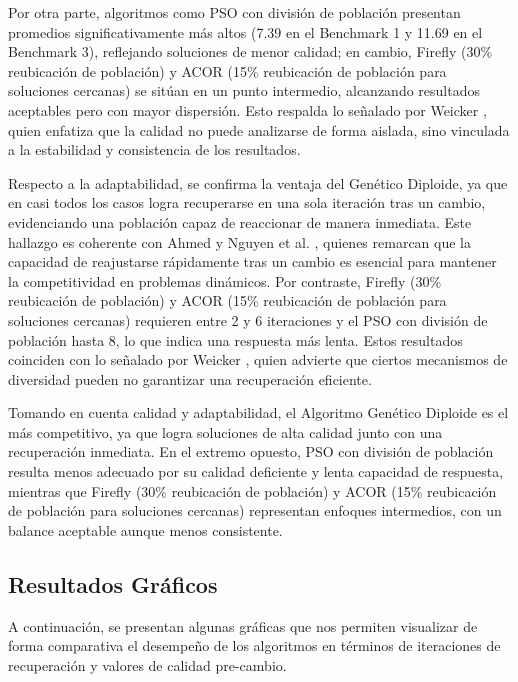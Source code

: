 \documentclass[10pt]{article}
\begin{document}
Por otra parte, algoritmos como PSO con división de población presentan promedios significativamente más altos (7.39 en el Benchmark 1 y 11.69 en el Benchmark 3), reflejando soluciones de menor calidad; en cambio, Firefly (30\% reubicación de población) y ACOR (15\% reubicación de población para soluciones cercanas) se sitúan en un punto intermedio, alcanzando resultados aceptables pero con mayor dispersión. Esto respalda lo señalado por Weicker \cite{weicker2003performance}, quien enfatiza que la calidad no puede analizarse de forma aislada, sino vinculada a la estabilidad y consistencia de los resultados.

Respecto a la adaptabilidad, se confirma la ventaja del Genético Diploide, ya que en casi todos los casos logra recuperarse en una sola iteración tras un cambio, evidenciando una población capaz de reaccionar de manera inmediata. Este hallazgo es coherente con Ahmed \cite{ahmed2024adaptive} y Nguyen et al. \cite{nguyen2013kd}, quienes remarcan que la capacidad de reajustarse rápidamente tras un cambio es esencial para mantener la competitividad en problemas dinámicos. Por contraste, Firefly (30\% reubicación de población) y ACOR (15\% reubicación de población para soluciones cercanas) requieren entre 2 y 6 iteraciones y el PSO con división de población hasta 8, lo que indica una respuesta más lenta. Estos resultados coinciden con lo señalado por Weicker \cite{weicker2003performance}, quien advierte que ciertos mecanismos de diversidad pueden no garantizar una recuperación eficiente.

Tomando en cuenta calidad y adaptabilidad, el Algoritmo Genético Diploide es el más competitivo, ya que logra soluciones de alta calidad junto con una recuperación inmediata. En el extremo opuesto, PSO con división de población resulta menos adecuado por su calidad deficiente y lenta capacidad de respuesta, mientras que Firefly (30\% reubicación de población) y ACOR (15\% reubicación de población para soluciones cercanas) representan enfoques intermedios, con un balance aceptable aunque menos consistente.



\subsection*{Resultados Gráficos}

A continuación, se presentan algunas gráficas que nos permiten visualizar de forma comparativa el desempeño de los algoritmos en términos de iteraciones de recuperación y valores de calidad pre-cambio.
\end{document}
